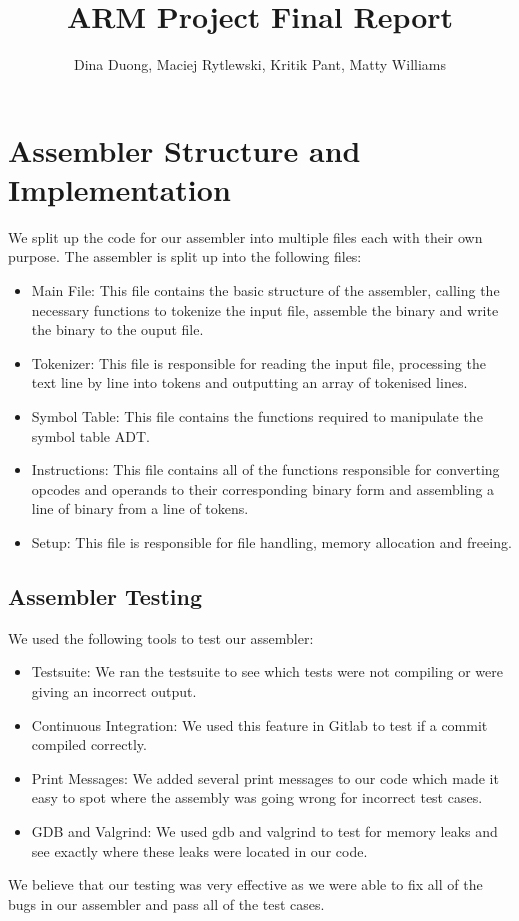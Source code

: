 \documentclass[11pt]{article}
\begin{document}
\title{
    \vspace{-2cm}
    ARM Project Final Report}
\author{Dina Duong, Maciej Rytlewski, Kritik Pant, Matty Williams}

\maketitle

\section{Assembler Structure and Implementation}

We split up the code for our assembler into multiple files each with their own purpose. 
\newline
The assembler is split up into the following files:

\begin{itemize}
    \item Main File: This file contains the basic structure of the assembler, calling the necessary functions to tokenize the input file, assemble the binary and write the binary to the ouput file.
    \item Tokenizer: This file is responsible for reading the input file, processing the text line by line into tokens and outputting an array of tokenised lines.
    \item Symbol Table: This file contains the functions required to manipulate the symbol table ADT.
    \item Instructions: This file contains all of the functions responsible for converting opcodes and operands to their corresponding binary form and assembling a line of binary from a line of tokens.
    \item Setup: This file is responsible for file handling, memory allocation and freeing. 
\end{itemize}

\subsection{Assembler Testing}
We used the following tools to test our assembler:
\begin{itemize}
    \item Testsuite: We ran the testsuite to see which tests were not compiling or were giving an incorrect output.
    \item Continuous Integration: We used this feature in Gitlab to test if a commit compiled correctly.
    \item Print Messages: We added several print messages to our code which made it easy to spot where the assembly was going wrong for incorrect test cases. 
    \item GDB and Valgrind: We used gdb and valgrind to test for memory leaks and see exactly where these leaks were located in our code.
\end{itemize}
We believe that our testing was very effective as we were able to fix all of the bugs in our assembler and pass all of the test cases.
\end{document}
